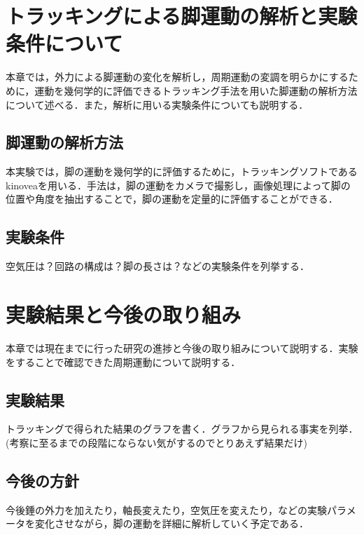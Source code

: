 \documentclass[uplatex,dvipdfmx]{jsarticle}
\begin{document}
\section{トラッキングによる脚運動の解析と実験条件について}
本章では，外力による脚運動の変化を解析し，周期運動の変調を明らかにするために，運動を幾何学的に評価できるトラッキング手法を用いた脚運動の解析方法について述べる．また，解析に用いる実験条件についても説明する．
\subsection{脚運動の解析方法}
本実験では，脚の運動を幾何学的に評価するために，トラッキングソフトであるkinoveaを用いる．手法は，脚の運動をカメラで撮影し，画像処理によって脚の位置や角度を抽出することで，脚の運動を定量的に評価することができる．
\subsection{実験条件}
空気圧は？回路の構成は？脚の長さは？などの実験条件を列挙する．
\section{実験結果と今後の取り組み}
本章では現在までに行った研究の進捗と今後の取り組みについて説明する．実験をすることで確認できた周期運動について説明する．
\subsection{実験結果}
トラッキングで得られた結果のグラフを書く．グラフから見られる事実を列挙．(考察に至るまでの段階にならない気がするのでとりあえず結果だけ)
\subsection{今後の方針}
今後錘の外力を加えたり，軸長変えたり，空気圧を変えたり，などの実験パラメータを変化させながら，脚の運動を詳細に解析していく予定である．
{\small
%


}

\clearpage
\end{document}
